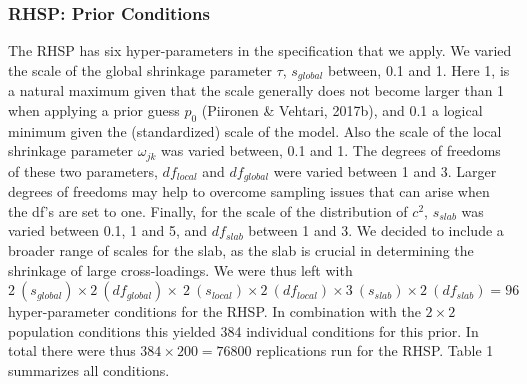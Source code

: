 \documentclass[
  man, donotrepeattitle,floatsintext]{apa6}
\begin{document}
\hypertarget{rhsp-prior-conditions}{%
\subsubsection{RHSP: Prior Conditions}\label{rhsp-prior-conditions}}

The RHSP has six hyper-parameters in the specification that we apply. We varied the scale of the global shrinkage parameter \(\tau\), \(s_{global}\) between, 0.1 and 1. Here 1, is a natural maximum given that the scale generally does not become larger than 1 when applying a prior guess \(p_0\) (Piironen \& Vehtari, 2017b), and 0.1 a logical minimum given the (standardized) scale of the model. Also the scale of the local shrinkage parameter \(\omega_{jk}\) was varied between, 0.1 and 1. The degrees of freedoms of these two parameters, \(df_{local}\) and \(df_{global}\) were varied between 1 and 3. Larger degrees of freedoms may help to overcome sampling issues that can arise when the df's are set to one. Finally, for the scale of the distribution of \(c^2\), \(s_{slab}\) was varied between 0.1, 1 and 5, and \(df_{slab}\) between 1 and 3. We decided to include a broader range of scales for the slab, as the slab is crucial in determining the shrinkage of large cross-loadings. We were thus left with \(2 \ (s_{global}) \times 2 \ (df_{global}) \times \ 2 \ (s_{local}) \times2 \ (df_{local}) \times 3 \ (s_{slab}) \times2 \ (df_{slab}) = 96\) hyper-parameter conditions for the RHSP. In combination with the \(2 \times 2\) population conditions this yielded 384 individual conditions for this prior. In total there were thus \(384 \times 200 = 76800\) replications run for the RHSP. Table 1 summarizes all conditions.
\end{document}
